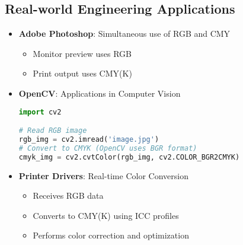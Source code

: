 \documentclass[12pt]{article}
\begin{document}
\subsection{Real-world Engineering Applications}
\begin{itemize}
    \item \textbf{Adobe Photoshop}: Simultaneous use of RGB and CMY
    \begin{itemize}
        \item Monitor preview uses RGB
        \item Print output uses CMY(K)
    \end{itemize}
    \item \textbf{OpenCV}: Applications in Computer Vision
    \begin{lstlisting}[language=python, caption=OpenCV Color Space Conversion]
import cv2

# Read RGB image
rgb_img = cv2.imread('image.jpg')
# Convert to CMYK (OpenCV uses BGR format)
cmyk_img = cv2.cvtColor(rgb_img, cv2.COLOR_BGR2CMYK)
    \end{lstlisting}
    \item \textbf{Printer Drivers}: Real-time Color Conversion
    \begin{itemize}
        \item Receives RGB data
        \item Converts to CMY(K) using ICC profiles
        \item Performs color correction and optimization
    \end{itemize}
\end{itemize}
\end{document}

